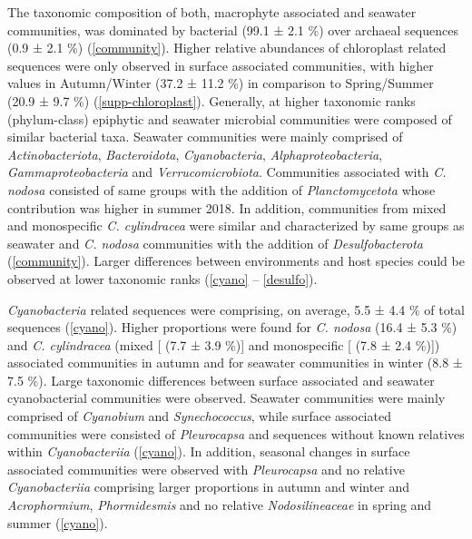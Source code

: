 \documentclass[12pt,]{article}
\begin{document}
The taxonomic composition of both, macrophyte associated and seawater
communities, was dominated by bacterial (99.1 ± 2.1 \si{\percent}) over
archaeal sequences (0.9 ± 2.1 \si{\percent}) (\autoref{community}).
Higher relative abundances of chloroplast related sequences were only
observed in surface associated communities, with higher values in
Autumn/Winter (37.2 ± 11.2 \si{\percent}) in comparison to Spring/Summer
(20.9 ± 9.7 \si{\percent}) (\autoref{supp-chloroplast}). Generally, at
higher taxonomic ranks (phylum-class) epiphytic and seawater microbial
communities were composed of similar bacterial taxa. Seawater
communities were mainly comprised of \emph{Actinobacteriota},
\emph{Bacteroidota}, \emph{Cyanobacteria}, \emph{Alphaproteobacteria},
\emph{Gammaproteobacteria} and \emph{Verrucomicrobiota}. Communities
associated with \emph{C. nodosa} consisted of same groups with the
addition of \emph{Planctomycetota} whose contribution was higher in
summer 2018. In addition, communities from mixed and monospecific
\emph{C. cylindracea} were similar and characterized by same groups as
seawater and \emph{C. nodosa} communities with the addition of
\emph{Desulfobacterota} (\autoref{community}). Larger differences
between environments and host species could be observed at lower
taxonomic ranks (\autoref{cyano} -- \ref{desulfo}).

\emph{Cyanobacteria} related sequences were comprising, on average, 5.5
± 4.4 \si{\percent} of total sequences (\autoref{cyano}). Higher
proportions were found for \emph{C. nodosa} (16.4 ± 5.3 \si{\percent})
and \emph{C. cylindracea} (mixed {[} (7.7 ± 3.9 \si{\percent}){]} and
monospecific {[} (7.8 ± 2.4 \si{\percent}){]}) associated communities in
autumn and for seawater communities in winter (8.8 ± 7.5 \si{\percent}).
Large taxonomic differences between surface associated and seawater
cyanobacterial communities were observed. Seawater communities were
mainly comprised of \emph{Cyanobium} and \emph{Synechococcus}, while
surface associated communities were consisted of \emph{Pleurocapsa} and
sequences without known relatives within \emph{Cyanobacteriia}
(\autoref{cyano}). In addition, seasonal changes in surface associated
communities were observed with \emph{Pleurocapsa} and no relative
\emph{Cyanobacteriia} comprising larger proportions in autumn and winter
and \emph{Acrophormium}, \emph{Phormidesmis} and no relative
\emph{Nodosilineaceae} in spring and summer (\autoref{cyano}).
\end{document}
